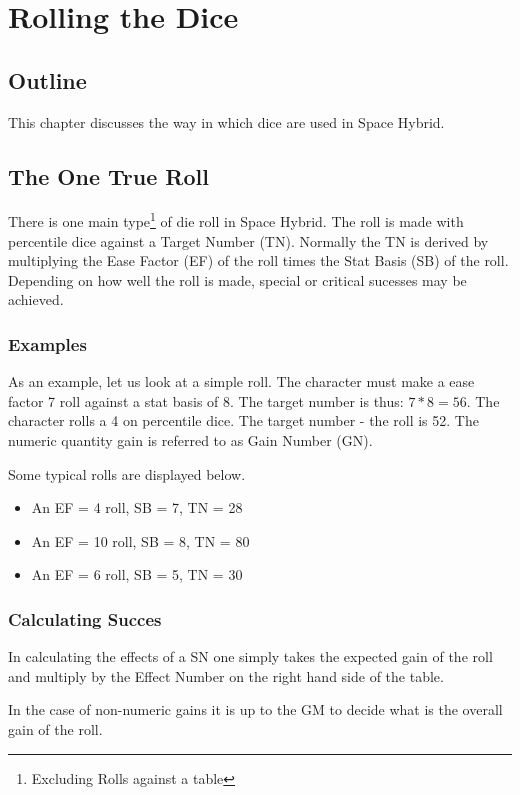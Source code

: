 \chapter{Rolling the Dice}

\section{Outline}
This chapter discusses the way in which dice are used in Space Hybrid.

\section{The One True Roll}
There is one main type\footnote{Excluding Rolls against a table}
of die roll in Space Hybrid. The roll is made
with percentile dice against a Target Number (TN). Normally the TN is
derived by multiplying the Ease Factor (EF) of the roll times the 
Stat Basis (SB) of the roll. Depending on how well the roll is made, 
special or critical sucesses may be achieved.



\subsection{Examples}
As an example, let us look at a simple roll. The character must make a
ease factor 7 roll against a stat basis of 8. The target number is
thus: \(7*8 = 56\). The character rolls a 4 on percentile dice. The target
number - the roll is 52. The numeric quantity gain is
referred to as Gain Number (GN).

Some typical rolls are displayed below.

\begin{itemize}
	\item An EF = 4 roll, SB = 7, TN = 28
	\item An EF = 10 roll, SB = 8, TN = 80
	\item An EF = 6 roll, SB = 5, TN = 30
\end{itemize}

\subsection{Calculating Succes}
In calculating the effects of a SN one simply takes the expected 
gain of the roll and multiply by the Effect Number on the right hand 
side of the table.

In the case of non-numeric gains it is up to the GM to decide 
what is the overall gain of the roll.




